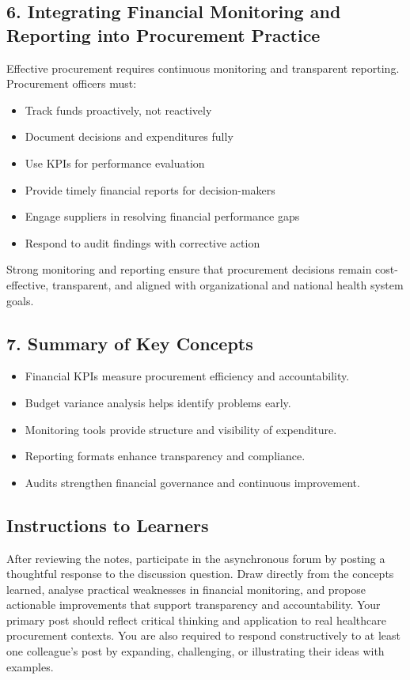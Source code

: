 \documentclass[10pt]{article}
\begin{document}
\subsection*{6. Integrating Financial Monitoring and Reporting into Procurement Practice}
Effective procurement requires continuous monitoring and transparent reporting. Procurement officers must:

\begin{itemize}
  \item Track funds proactively, not reactively
  \item Document decisions and expenditures fully
  \item Use KPIs for performance evaluation
  \item Provide timely financial reports for decision-makers
  \item Engage suppliers in resolving financial performance gaps
  \item Respond to audit findings with corrective action
\end{itemize}

Strong monitoring and reporting ensure that procurement decisions remain cost-effective, transparent, and aligned with organizational and national health system goals.

\subsection*{7. Summary of Key Concepts}
\begin{itemize}
  \item Financial KPIs measure procurement efficiency and accountability.
  \item Budget variance analysis helps identify problems early.
  \item Monitoring tools provide structure and visibility of expenditure.
  \item Reporting formats enhance transparency and compliance.
  \item Audits strengthen financial governance and continuous improvement.
\end{itemize}

\subsection*{Instructions to Learners}
After reviewing the notes, participate in the asynchronous forum by posting a thoughtful response to the discussion question. Draw directly from the concepts learned, analyse practical weaknesses in financial monitoring, and propose actionable improvements that support transparency and accountability. Your primary post should reflect critical thinking and application to real healthcare procurement contexts. You are also required to respond constructively to at least one colleague's post by expanding, challenging, or illustrating their ideas with examples.
\end{document}
